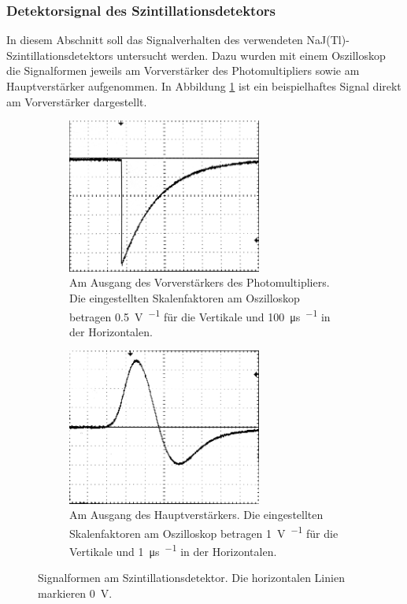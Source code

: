 \documentclass[11pt, a4paper]{article}
\numberwithin{equation}{section}
\begin{document}
\subsubsection{Detektorsignal des Szintillationsdetektors}
\label{sec:detektorsignal_szinti}
In diesem Abschnitt soll das Signalverhalten des verwendeten NaJ(Tl)-Szintillationsdetektors untersucht werden.
Dazu wurden mit einem Oszilloskop die Signalformen jeweils am Vorverstärker des Photomultipliers sowie am Hauptverstärker aufgenommen.
In Abbildung \ref{fig:signal_szinti_vor} ist ein beispielhaftes Signal direkt am Vorverstärker dargestellt.
\begin{figure}[h]
	\centering
	\begin{subfigure}[b]{0.7\textwidth}
		\centering
		\includegraphics[width=0.7\textwidth]{./figures/signale/vor_szinti_abgeschnitten.jpg}
		\caption{Am Ausgang des Vorverstärkers des Photomultipliers. Die eingestellten Skalenfaktoren am Oszilloskop betragen \SI{0.5}{\volt\per\division} für die Vertikale und \SI{100}{\micro\second\per\division} in der Horizontalen.}
		\label{fig:signal_szinti_vor}
	\end{subfigure}
	
	\begin{subfigure}[b]{0.7\textwidth}
		\centering
		\includegraphics[width=0.7\textwidth]{./figures/signale/haupt_szinti_abgeschnitten.jpg}
		\caption{Am Ausgang des Hauptverstärkers. Die eingestellten Skalenfaktoren am Oszilloskop betragen \SI{1}{\volt\per\division} für die Vertikale und \SI{1}{\micro\second\per\division} in der Horizontalen.}
		\label{fig:signal_szinti_haupt}
	\end{subfigure}
	\caption{Signalformen am Szintillationsdetektor. Die horizontalen Linien markieren \SI{0}{\volt}.}
\end{figure}
\end{document}
